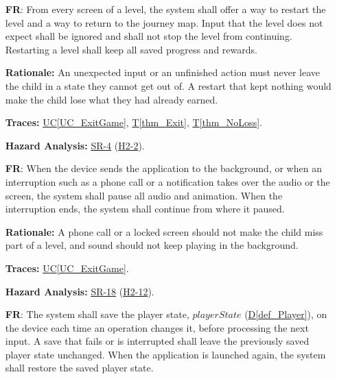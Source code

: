 \documentclass[12pt]{article}
\newcommand{\ucref}[1]{\hyperref[#1]{UC\ref*{#1}}}
\newcounter{reqnum} %
\newcommand{\thmref}[1]{\hyperref[#1]{T\ref*{#1}}}
\newcommand{\defref}[1]{\hyperref[#1]{D\ref*{#1}}}
\newcommand{\haurl}{https://team-hindsight.github.io/ophthamology-game/HazardAnalysis/HazardAnalysis.pdf}
\newcommand{\hasrref}[2]{\href{\haurl\#nameddest=sr:#1}{SR-#2}}
\newcommand{\hahazref}[2]{\href{\haurl\#nameddest=haz:#1}{H#2}}
\newcommand{\hazsr}[4]{\hasrref{#1}{#2} (\hahazref{#3}{#4})}
\begin{document}
\begin{itemize}
\textbf{Rationale:} Restarting from the beginning is simpler for a young child
than resuming in the middle of a level they may not remember.

\textbf{Traces:} \ucref{UC_ExitGame}.

\textbf{Hazard Analysis:} \hazsr{GameplayRecovery}{4}{GameplayStuck}{2-2}.

\item[\refstepcounter{reqnum}\textbf{FR\thereqnum}\label{FR_RestartLevel}:]
From every screen of a level, the system shall offer a way to restart the
level and a way to return to the journey map. Input that the level does not
expect shall be ignored and shall not stop the level from continuing.
Restarting a level shall keep all saved progress and rewards.

\textbf{Rationale:} An unexpected input or an unfinished action must never leave the child in
a state they cannot get out of. A restart that kept nothing would make the
child lose what they had already earned.

\textbf{Traces:} \ucref{UC_ExitGame}, \thmref{thm_Exit}, \thmref{thm_NoLoss}.

\textbf{Hazard Analysis:} \hazsr{GameplayRecovery}{4}{GameplayStuck}{2-2}.

\item[\refstepcounter{reqnum}\textbf{FR\thereqnum}\label{FR_Suspend}:]
When the device sends the application to the background, or when an
interruption such as a phone call or a notification takes over the audio or
the screen, the system shall pause all audio and animation. When the
interruption ends, the system shall continue from where it paused.

\textbf{Rationale:} A phone call or a locked screen should not make the child
miss part of a level, and sound should not keep playing in the background.

\textbf{Traces:} \ucref{UC_ExitGame}.

\textbf{Hazard Analysis:} \hazsr{NarrationMuted}{18}{NarrationDisabledSetting}{2-12}.

\item[\refstepcounter{reqnum}\textbf{FR\thereqnum}\label{FR_PersistState}:]
The system shall save the player state, $\mathit{playerState}$
(\defref{def_Player}), on the device each time an operation changes it, before
processing the next input. A save that fails or is interrupted shall leave the
previously saved player state unchanged. When the application is launched
again, the system shall restore the saved player state.


\end{itemize}
\end{document}
